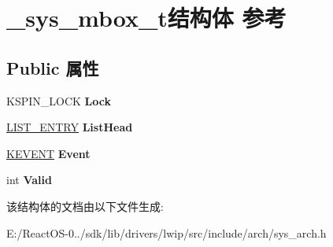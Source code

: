 \hypertarget{struct__sys__mbox__t}{}\section{\+\_\+sys\+\_\+mbox\+\_\+t结构体 参考}
\label{struct__sys__mbox__t}
\subsection*{Public 属性}
\begin{DoxyCompactItemize}
\item 
\mbox{\label{struct__sys__mbox__t_a00f05d184b080b443c5d52845d11e28c}} 
K\+S\+P\+I\+N\+\_\+\+L\+O\+CK {\bfseries Lock}
\item 
\mbox{\label{struct__sys__mbox__t_ac77b66538137c7aa2002bac643d7defe}} 
\hyperlink{struct___l_i_s_t___e_n_t_r_y}{L\+I\+S\+T\+\_\+\+E\+N\+T\+RY} {\bfseries List\+Head}
\item 
\mbox{\label{struct__sys__mbox__t_ac515654cd058e5fcb2c702624012c875}} 
\hyperlink{struct___k_e_v_e_n_t}{K\+E\+V\+E\+NT} {\bfseries Event}
\item 
\mbox{\label{struct__sys__mbox__t_aa3f8becd6f80591b9080b67c63a24568}} 
int {\bfseries Valid}
\end{DoxyCompactItemize}


该结构体的文档由以下文件生成\+:\begin{DoxyCompactItemize}
\item 
E\+:/\+React\+O\+S-\/0../sdk/lib/drivers/lwip/src/include/arch/sys\+\_\+arch.\+h\end{DoxyCompactItemize}
